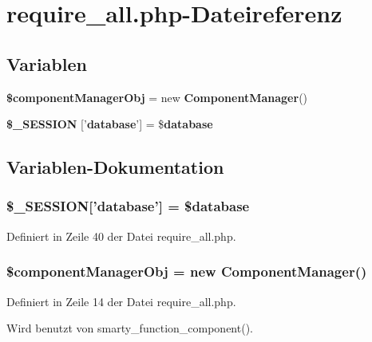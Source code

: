 \section{require\_\-all.php-Dateireferenz}
\label{require__all_8php}
\subsection*{Variablen}
\begin{CompactItemize}
\item 
{\bf \$componentManagerObj} = new {\bf ComponentManager}()
\item 
{\bf \$\_\-SESSION} ['{\bf database}'] = \${\bf database}
\end{CompactItemize}


\subsection{Variablen-Dokumentation}
\subsubsection{\setlength{\rightskip}{0pt plus 5cm}\$\_\-SESSION['{\bf database}'] = \${\bf database}}\label{require__all_8php_b6ac03f1408f7a15fa1ee4333fff2435}




Definiert in Zeile 40 der Datei require\_\-all.php.
\subsubsection{\setlength{\rightskip}{0pt plus 5cm}\$componentManagerObj = new {\bf ComponentManager}()}\label{require__all_8php_d7adaf6a45001a40046546e1f9e7b63d}




Definiert in Zeile 14 der Datei require\_\-all.php.

Wird benutzt von smarty\_\-function\_\-component().